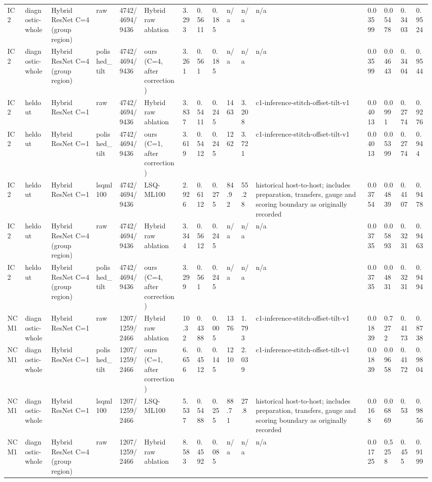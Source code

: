 \begin{tabular}{llllllllllllllll}
IC2 & diagnostic-whole & Hybrid ResNet C=4 (group region) & raw & 4742/4694/9436 & Hybrid raw ablation & 3.293 & 0.5611 & 0.185 & n/a & n/a & n/a & 0.03599 & 0.05478 & 0.3403 & 0.9524 \\
IC2 & diagnostic-whole & Hybrid ResNet C=4 (group region) & polished\_tilt & 4742/4694/9436 & ours (C=4, after correction) & 3.261 & 0.561 & 0.185 & n/a & n/a & n/a & 0.03599 & 0.04643 & 0.3404 & 0.9544 \\
IC2 & heldout & Hybrid ResNet C=1 & raw & 4742/4694/9436 & Hybrid raw ablation & 3.837 & 0.5411 & 0.245 & 1463 & 3.208 & c1-inference-stitch-offset-tilt-v1 & 0.04013 & 0.0991 & 0.2774 & 0.9276 \\
IC2 & heldout & Hybrid ResNet C=1 & polished\_tilt & 4742/4694/9436 & ours (C=1, after correction) & 3.619 & 0.5412 & 0.245 & 1262 & 3.721 & c1-inference-stitch-offset-tilt-v1 & 0.04013 & 0.05399 & 0.2774 & 0.944 \\
IC2 & heldout & Hybrid ResNet C=1 & lsqml100 & 4742/4694/9436 & LSQ-ML100 & 2.926 & 0.6112 & 0.275 & 84.92 & 55.28 & historical host-to-host; includes preparation, transfers, gauge and scoring boundary as originally recorded & 0.03754 & 0.04839 & 0.4107 & 0.9478 \\
IC2 & heldout & Hybrid ResNet C=4 (group region) & raw & 4742/4694/9436 & Hybrid raw ablation & 3.344 & 0.5612 & 0.245 & n/a & n/a & n/a & 0.03735 & 0.05893 & 0.3231 & 0.9463 \\
IC2 & heldout & Hybrid ResNet C=4 (group region) & polished\_tilt & 4742/4694/9436 & ours (C=4, after correction) & 3.299 & 0.561 & 0.245 & n/a & n/a & n/a & 0.03735 & 0.04831 & 0.3231 & 0.9494 \\
NCM1 & diagnostic-whole & Hybrid ResNet C=1 & raw & 1207/1259/2466 & Hybrid raw ablation & 10.32 & 0.4388 & 0.005 & 1376 & 1.793 & c1-inference-stitch-offset-tilt-v1 & 0.01839 & 0.7272 & 0.4173 & 0.8738 \\
NCM1 & diagnostic-whole & Hybrid ResNet C=1 & polished\_tilt & 1207/1259/2466 & ours (C=1, after correction) & 6.656 & 0.4512 & 0.145 & 1210 & 2.039 & c1-inference-stitch-offset-tilt-v1 & 0.01839 & 0.09658 & 0.4172 & 0.9804 \\
NCM1 & diagnostic-whole & Hybrid ResNet C=1 & lsqml100 & 1207/1259/2466 & LSQ-ML100 & 5.537 & 0.5488 & 0.255 & 88.71 & 27.8 & historical host-to-host; includes preparation, transfers, gauge and scoring boundary as originally recorded & 0.0168 & 0.06869 & 0.53 & 0.9856 \\
NCM1 & diagnostic-whole & Hybrid ResNet C=4 (group region) & raw & 1207/1259/2466 & Hybrid raw ablation & 8.583 & 0.4592 & 0.085 & n/a & n/a & n/a & 0.01725 & 0.5258 & 0.455 & 0.9199 \\

\end{tabular}
